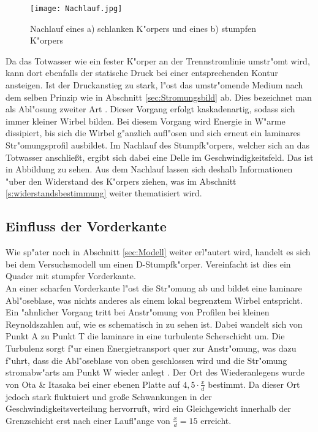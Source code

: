  \begin{figure}[h]
	\centering
	\texttt{[image: Nachlauf.jpg]}
	\caption{Nachlauf eines a) schlanken K"orpers und eines b) stumpfen K"orpers \cite{Hucho.2011}}
	\label{fig:Nachlauf}
\end{figure}

Da das Totwasser wie ein fester K"orper an der Trennstromlinie umstr"omt wird, kann dort ebenfalls der statische Druck bei einer entsprechenden Kontur ansteigen. Ist der Druckanstieg zu stark, l"ost das umstr"omende Medium nach dem selben Prinzip wie in Abschnitt \ref{sec:Stromungsbild} ab. Dies bezeichnet man als Abl"osung zweiter Art \cite{Leder.1992}. Dieser Vorgang erfolgt kaskadenartig, sodass sich immer kleiner Wirbel bilden. Bei diesem Vorgang wird Energie  in W"arme dissipiert, bis sich die Wirbel g"anzlich aufl"osen und sich erneut ein laminares Str"omungsprofil ausbildet. Im Nachlauf des Stumpfk"orpers, welcher sich an das Totwasser anschlie\ss{}t, ergibt sich dabei eine Delle im Geschwindigkeitsfeld. Das ist in Abbildung  zu sehen. Aus dem Nachlauf lassen sich deshalb Informationen "uber den Widerstand des K"orpers ziehen, was im Abschnitt \ref{s:widerstandsbestimmung} weiter thematisiert wird.

\subsection{Einfluss der Vorderkante} 
\label{sec:Vorderkante}
Wie sp"ater noch in Abschnitt \ref{sec:Modell} weiter erl"autert wird, handelt es sich bei dem Versuchsmodell um einen D-Stumpfk"orper. Vereinfacht ist dies ein Quader mit stumpfer Vorderkante.\\ 
An einer scharfen Vorderkante l"ost die Str"omung ab und bildet eine laminare Abl"oseblase, was nichts anderes als einem lokal begrenztem Wirbel entspricht. Ein "ahnlicher Vorgang tritt bei Anstr"omung von Profilen bei kleinen Reynoldszahlen auf, wie es schematisch in  zu sehen ist. Dabei wandelt sich von Punkt A zu Punkt T die laminare in eine turbulente Scherschicht um. Die Turbulenz sorgt f"ur einen Energietransport quer zur Anstr"omung, was dazu f"uhrt, dass die Abl"oseblase von oben geschlossen wird und die Str"omung stromabw"arts am Punkt W wieder anlegt \cite{Siegman.2015}. Der Ort des Wiederanlegens wurde von Ota \& Itasaka \cite{Ota.1976} bei einer ebenen Platte auf $4,5 \cdot \frac{x}{d}$ bestimmt. Da dieser Ort jedoch stark fluktuiert und gro\ss{}e Schwankungen in der Geschwindigkeitsverteilung hervorruft, wird ein Gleichgewicht innerhalb der Grenzschicht erst nach einer Laufl"ange von $\frac{x}{d} = 15$ erreicht.
  
